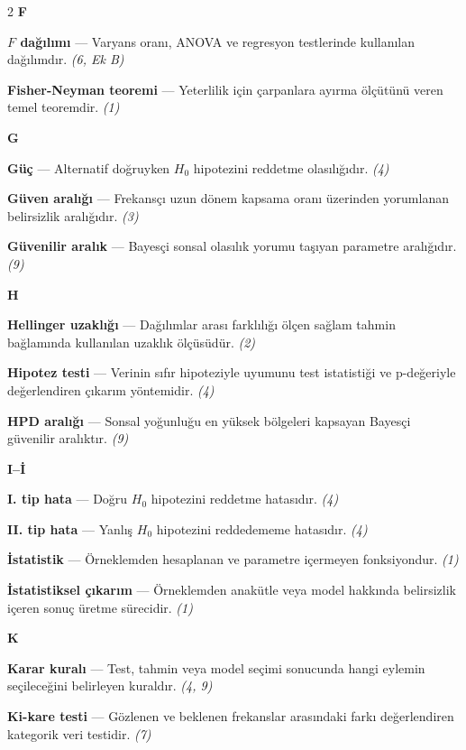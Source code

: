 \begin{multicols}{2}
\medskip
\noindent\textbf{\large F}\par\smallskip
\textbf{$F$ dağılımı} --- Varyans oranı, ANOVA ve regresyon testlerinde kullanılan dağılımdır. \emph{(6, Ek B)}\par
\textbf{Fisher-Neyman teoremi} --- Yeterlilik için çarpanlara ayırma ölçütünü veren temel teoremdir. \emph{(1)}\par
\medskip
\noindent\textbf{\large G}\par\smallskip
\textbf{Güç} --- Alternatif doğruyken $H_0$ hipotezini reddetme olasılığıdır. \emph{(4)}\par
\textbf{Güven aralığı} --- Frekansçı uzun dönem kapsama oranı üzerinden yorumlanan belirsizlik aralığıdır. \emph{(3)}\par
\textbf{Güvenilir aralık} --- Bayesçi sonsal olasılık yorumu taşıyan parametre aralığıdır. \emph{(9)}\par
\medskip
\noindent\textbf{\large H}\par\smallskip
\textbf{Hellinger uzaklığı} --- Dağılımlar arası farklılığı ölçen sağlam tahmin bağlamında kullanılan uzaklık ölçüsüdür. \emph{(2)}\par
\textbf{Hipotez testi} --- Verinin sıfır hipoteziyle uyumunu test istatistiği ve p-değeriyle değerlendiren çıkarım yöntemidir. \emph{(4)}\par
\textbf{HPD aralığı} --- Sonsal yoğunluğu en yüksek bölgeleri kapsayan Bayesçi güvenilir aralıktır. \emph{(9)}\par
\medskip
\noindent\textbf{\large I--İ}\par\smallskip
\textbf{I. tip hata} --- Doğru $H_0$ hipotezini reddetme hatasıdır. \emph{(4)}\par
\textbf{II. tip hata} --- Yanlış $H_0$ hipotezini reddedememe hatasıdır. \emph{(4)}\par
\textbf{İstatistik} --- Örneklemden hesaplanan ve parametre içermeyen fonksiyondur. \emph{(1)}\par
\textbf{İstatistiksel çıkarım} --- Örneklemden anakütle veya model hakkında belirsizlik içeren sonuç üretme sürecidir. \emph{(1)}\par
\medskip
\noindent\textbf{\large K}\par\smallskip
\textbf{Karar kuralı} --- Test, tahmin veya model seçimi sonucunda hangi eylemin seçileceğini belirleyen kuraldır. \emph{(4, 9)}\par
\textbf{Ki-kare testi} --- Gözlenen ve beklenen frekanslar arasındaki farkı değerlendiren kategorik veri testidir. \emph{(7)}\par

\end{multicols}

